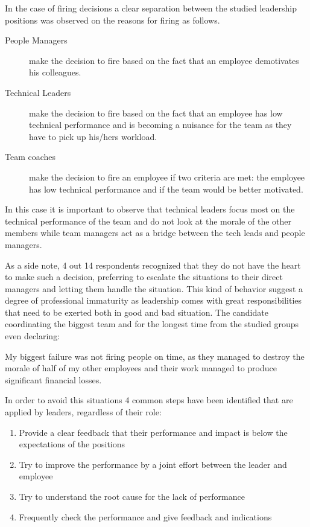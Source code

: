 In the case of firing decisions a clear separation between the studied leadership positions was observed on the reasons for firing as follows.

\begin{description}
\item [People Managers] make the decision to fire based on the fact that an employee demotivates his colleagues.
\item [Technical Leaders] make the decision to fire based on the fact that an employee has low technical performance and is becoming a nuisance for the team as they have to pick up his/hers workload.
\item [Team coaches] make the decision to fire an employee if two criteria are met: the employee has low technical performance and if the team would be better motivated.
\end{description}

In this case it is important to observe that technical leaders focus most on the technical performance of the team and do not look at the morale of the other members while team managers act as a bridge between the tech leads and people managers. 

As a side note, 4 out 14 respondents recognized that they do not have the heart to make such a decision, preferring to escalate the situations to their direct managers and letting them handle the situation. This kind of behavior suggest a degree of professional immaturity as leadership comes with great responsibilities that need to be exerted both in good and bad situation. The candidate coordinating the biggest team and for the longest time from the studied groups even declaring:

\begin{displayquote}
My biggest failure was not firing people on time, as they managed to destroy the morale of half of my other employees and their work managed to produce significant financial losses.
\end{displayquote}

In order to avoid this situations 4 common steps have been identified that are applied by leaders, regardless of their role:

\begin{enumerate}
\item Provide a clear feedback that their performance and impact is below the expectations of the positions
\item Try to improve the performance by a joint effort between the leader and employee
\item Try to understand the root cause for the lack of performance
\item Frequently check the performance and give feedback and indications
\end{enumerate}

